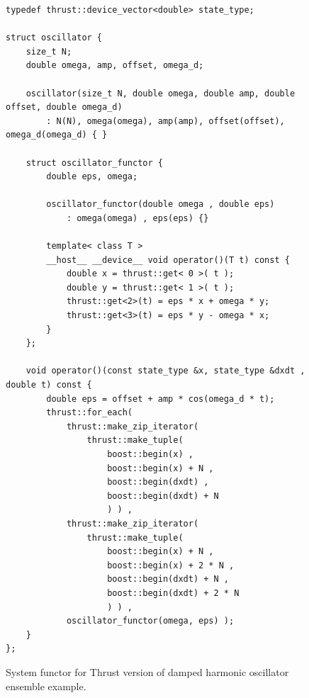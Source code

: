 \documentclass[1p]{elsarticle}
\begin{document}
\begin{figure}[p]
\begin{lstlisting}
typedef thrust::device_vector<double> state_type;

struct oscillator {
    size_t N;
    double omega, amp, offset, omega_d;

    oscillator(size_t N, double omega, double amp, double offset, double omega_d)
        : N(N), omega(omega), amp(amp), offset(offset), omega_d(omega_d) { }

    struct oscillator_functor {
        double eps, omega;

        oscillator_functor(double omega , double eps)
            : omega(omega) , eps(eps) {}

        template< class T >
        __host__ __device__ void operator()(T t) const {
            double x = thrust::get< 0 >( t );
            double y = thrust::get< 1 >( t );
            thrust::get<2>(t) = eps * x + omega * y;
            thrust::get<3>(t) = eps * y - omega * x;
        }
    };

    void operator()(const state_type &x, state_type &dxdt , double t) const {
        double eps = offset + amp * cos(omega_d * t);
        thrust::for_each(
            thrust::make_zip_iterator(
                thrust::make_tuple(
                    boost::begin(x) ,
                    boost::begin(x) + N ,
                    boost::begin(dxdt) ,
                    boost::begin(dxdt) + N 
                    ) ) ,
            thrust::make_zip_iterator(
                thrust::make_tuple(
                    boost::begin(x) + N ,
                    boost::begin(x) + 2 * N ,
                    boost::begin(dxdt) + N ,
                    boost::begin(dxdt) + 2 * N
                    ) ) ,
            oscillator_functor(omega, eps) );
    }
};
\end{lstlisting}
\caption{System functor for Thrust version of damped harmonic oscillator
ensemble example.}
\label{code:thrust:damped}
\end{figure}
\end{document}
